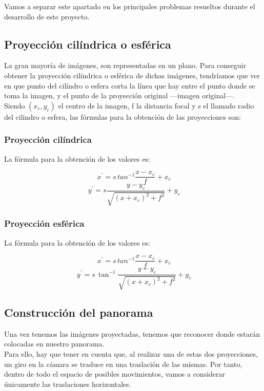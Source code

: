 \documentclass[10pt,a4paper]{article}
\theoremstyle{definition}
\begin{document}
Vamos a separar este apartado en los principales problemas resueltos durante el desarrollo de este proyecto. \\

\subsection{Proyección cilíndrica o esférica}

La gran mayoría de imágenes, son representadas en un plano. Para conseguir obtener la proyección cilíndrica o esférica de dichas imágenes, tendríamos que ver en que punto del cilíndro o esfera corta la línea que hay entre el punto donde se toma la imagen, y el  punto de la proyección original ---imagen original---.\\

Siendo $ (x_{c}, y_{c})$ el centro de la imagen, f la distancia focal y s el llamado radio del cilindro o esfera, las fórmulas para la obtención de las proyecciones son:

\subsubsection{Proyección cilíndrica}
 
 La fórmula para la obtención de los valores es:
 
 \[
 \ x^{'} = s\, tan^{-1} \frac{x - x_{c}}{f} +  x_{c}
 \]
 \[
 \ y^{'} = s\frac{y -y_{c}}{\sqrt{(x +x_{c})^{2}+f^{2}}} + y_{c}
 \]

\subsubsection{Proyección esférica}

La fórmula para la obtención de los valores es:

 \[
 \ x^{'} = s\, tan^{-1} \frac{x - x_{c}}{f} +  x_{c}
 \]
 \[
 \ y^{'} = s\, \tan^{-1} \frac{y -y_{c}}{\sqrt{(x +x_{c})^{2}+f^{2}}} + y_{c}
 \]
\subsection{Construcción del panorama}

Una vez tenemos las imágenes proyectadas, tenemos que reconocer donde estarán colocadas en nuestro panorama.\\

Para ello, hay que tener en cuenta que, al realizar una de estas dos proyecciones, un giro en la cámara se traduce en una traslación de las mismas. Por tanto, dentro de todo el espacio de posibles movimientos, vamos a considerar únicamente las traslaciones horizontales.\\
\end{document}
